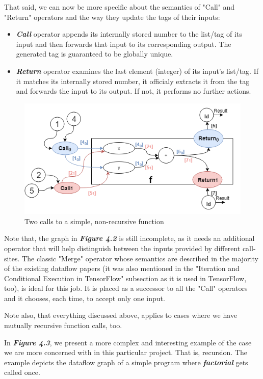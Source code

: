 \documentclass[ack,preface]{dithesis}
\begin{document}
That said, we can now be more specific about the semantics of  "Call" and "Return" operators and the way they update the tags of their inputs:
    \begin{itemize}
    \item \textit{\textbf{Call }} operator appends its internally stored number to the list/tag of its input and then forwards that input to its corresponding output. The generated tag is guaranteed to be globally unique.
    \item \textit{\textbf{Return }} operator examines the last element (integer) of its input's list/tag. If it matches its internally stored number, it officialy extracts it from the tag and forwards the input to its output. If not,  it performs no further actions.
    \end{itemize}

\begin{figure}
\centering
\includegraphics[scale=0.7]{figures/Example2}
\caption{Two calls to a simple, non-recursive function}
\end{figure}

Note that, the  graph in \textit{\textbf{Figure 4.2}} is still incomplete, as it needs an additional operator that will help distinguish between the inputs provided by different call-sites. The classic "Merge" operator whose semantics are described in the majority of  the existing dataflow papers (it was also mentioned in the "Iteration and Conditional Execution in TensorFlow" subsection as it is used in TensorFlow, too), is ideal for this job. It is placed as a successor to all the "Call" operators and it chooses, each time, to accept only one input.

Note also, that everything discussed above, applies to cases where we have mutually recursive function calls, too. 

In  \textit{\textbf{Figure 4.3}}, we present a more complex and interesting example of the case we are more concerned with in this particular project. That is, recursion. The example depicts the dataflow graph of a simple program where  \textit{\textbf{factorial}} gets called once.
\end{document}

